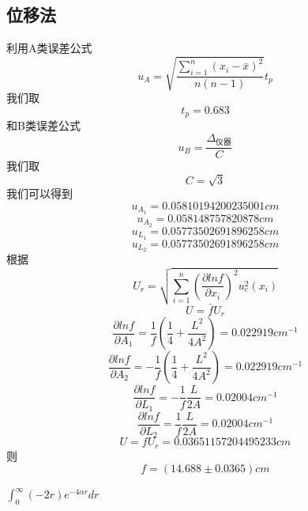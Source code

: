 \documentclass[10pt, a4paper]{article}
\begin{document}
	\subsection{位移法}
	利用A类误差公式\[u_A = \sqrt{\frac{\sum_{i=1}^n(x_i-\bar{x})^2}{n(n-1)}}t_p\]
	我们取\[t_p = 0.683\]
	和B类误差公式
	\[u_B = \frac{\Delta_{\text{仪器}}}{C}\]
	我们取\[C = \sqrt{3}\]
	我们可以得到
	\[u_{A_1} = 0.05810194200235001cm\]
	\[u_{A_2} = 0.058148757820878cm\]
	\[u_{L_1} = 0.05773502691896258cm\]
	\[u_{L_2} = 0.05773502691896258cm\]
	根据
	\[U_r = \sqrt{\sum_{i=1}^n(\frac{\partial lnf}{\partial x_i})^2u_c^2(x_i)}\]
	\[U = \bar{f}U_r\]
	\[\frac{\partial lnf}{\partial A_1}= \frac{1}{f}(\frac{1}{4}+\frac{L^2}{4A^2})=0.022919cm^{-1}\]
	\[\frac{\partial lnf}{\partial A_2}= -\frac{1}{f}(\frac{1}{4}+\frac{L^2}{4A^2})=0.022919cm^{-1}\]
	\[\frac{\partial lnf}{\partial L_1} = -\frac{1}{f}\frac{L}{2A}=0.02004cm^{-1}\]
	\[\frac{\partial lnf}{\partial L_2} = \frac{1}{f}\frac{L}{2A}=0.02004cm^{-1}\]
	\[U = fU_r = 0.03651157204495233cm\]
	则\[f = (14.688\pm0.0365)cm\]
	
	
    $\int_0^\infty(-2r)e^{-4\alpha r}dr$
\end{document}
